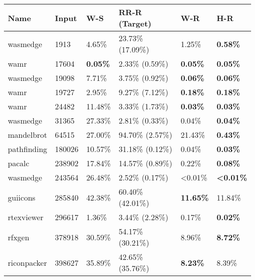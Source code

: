 \begin{tabular}{llllll}
\hline
 Name            & Input   & W-S            & RR-R (Target)            & W-R                       & H-R                       \\
\hline
 wasmedge#3018   & 1913    & 4.65\%          & 23.73\% (17.09\%)          & 1.25\%                     & \textbf{0.58\%}            \\
 wamr#2789       & 17604   & \textbf{0.05\%} & 2.33\% (0.59\%)            & \textbf{0.05\%}            & \textbf{0.05\%}            \\
 wasmedge#3019   & 19098   & 7.71\%          & 3.75\% (0.92\%)            & \textbf{0.06\%}            & \textbf{0.06\%}            \\
 wamr#2862       & 19727   & 2.95\%          & 9.27\% (7.12\%)            & \textbf{0.18\%}            & \textbf{0.18\%}            \\
 wamr#2450       & 24482   & 11.48\%         & 3.33\% (1.73\%)            & \textbf{0.03\%}            & \textbf{0.03\%}            \\
 wasmedge#3076   & 31365   & 27.33\%         & 2.81\% (0.33\%)            & 0.04\%                     & \textbf{0.04\%}            \\
 mandelbrot      & 64515   & 27.00\%         & 94.70\% (2.57\%)           & 21.43\%                    & \textbf{0.43\%}            \\
 pathfinding     & 180026  & 10.57\%         & 31.18\% (0.12\%)           & 0.04\%                     & \textbf{0.03\%}            \\
 pacalc          & 238902  & 17.84\%         & 14.57\% (0.89\%)           & 0.22\%                     & \textbf{0.08\%}            \\
 wasmedge#3057   & 243564  & 26.48\%         & 2.52\% (0.17\%)            & \textless{}0.01\%          & \textbf{\textless{}0.01\%} \\
 guiicons        & 285840  & 42.38\%         & 60.40\% (42.01\%)          & \textbf{11.65\%}           & 11.84\%                    \\
 rtexviewer      & 296617  & 1.36\%          & 3.44\% (2.28\%)            & 0.17\%                     & \textbf{0.02\%}            \\
 rfxgen          & 378918  & 30.59\%         & 54.17\% (30.21\%)          & 8.96\%                     & \textbf{8.72\%}            \\
 riconpacker     & 398627  & 35.89\%         & 42.65\% (35.76\%)          & \textbf{8.23\%}            & 8.39\%                     \\

\end{tabular}
